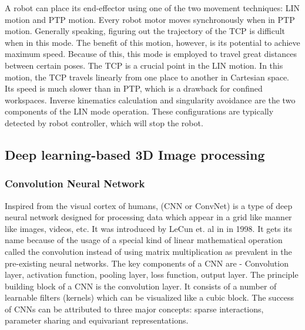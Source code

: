 A robot can place its end-effector using one of the two movement techniques: \ac{LIN} motion and \ac{PTP} motion. Every robot motor moves synchronously when in \ac{PTP} motion. Generally speaking, figuring out the trajectory of the \ac{TCP} is difficult when in this mode. The benefit of this motion, however, is its potential to achieve maximum speed. Because of this, this mode is employed to travel great distances between certain poses. The \ac{TCP} is a crucial point in the \ac{LIN} motion. In this motion, the \ac{TCP} travels linearly from one place to another in Cartesian space. Its speed is much slower than in \ac{PTP}, which is a drawback for confined workspaces. Inverse kinematics calculation and singularity avoidance are the two components of the \ac{LIN} mode operation. These configurations are typically detected by robot controller, which will stop the robot.\cite{spenrath2022heuristic}

\subsection{Deep learning-based 3D Image processing}
\subsubsection{Convolution Neural Network}
Inspired from the visual cortex of humans, (\ac{CNN} or ConvNet) is a type of deep neural network designed for processing data which appear in a grid like manner like images, videos, etc.  It was introduced by LeCun et. al in \cite{lecun1998gradient} in 1998.  It gets its name because of the usage of a special kind of linear mathematical operation called the convolution instead of using matrix multiplication as prevalent in the pre-existing neural networks. The key components of a \ac{CNN} are - Convolution layer, activation function, pooling layer, loss function, output layer. The principle building block of a CNN is the convolution layer. It consists of a number of learnable filters (kernels) which can be visualized like a cubic block. The success of \ac{CNN}s can be attributed to three major concepts: sparse interactions, parameter sharing and equivariant representations.\cite{Goodfellow-et-al-2016}
